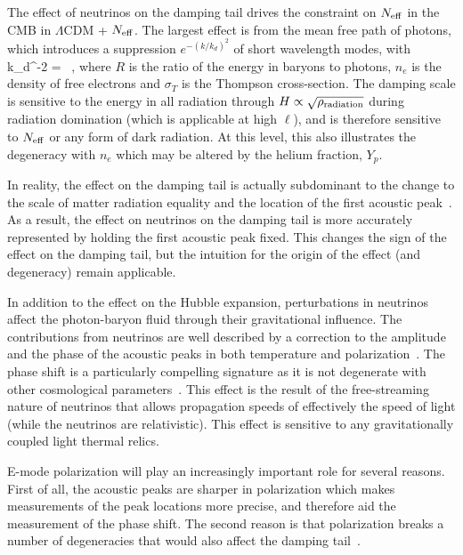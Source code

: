 The effect of neutrinos on the damping tail drives the constraint on $N_{\rm eff}$ in the CMB in $\Lambda$CDM + $N_{\rm eff}$.  The largest effect is from the mean free path of photons, which introduces a suppression $e^{-(k/k_d)^2}$ of short wavelength modes, with~\cite{Zaldarriaga:1995gi}
\beq
k_d^{-2} =\int {}  \ ,
\eeq
where $R$ is the ratio of the energy in baryons to photons, $n_e$ is the density of free electrons and $\sigma_T$ is the Thompson cross-section.  The damping scale is sensitive to the energy in all radiation through $H \propto \sqrt{\rho_{\rm radiation}}$ during radiation domination (which is applicable at high $\ell$), and is therefore sensitive to $N_{\rm eff}$ or any form of dark radiation.  At this level, this also illustrates the degeneracy with $n_e$ which may be altered by the helium fraction, $Y_p$.

In reality, the effect on the damping tail is actually subdominant to the change to the scale of matter radiation equality and the location of the first acoustic peak~\cite{Hou:2011ec}.  As a result, the effect on neutrinos on the damping tail is more accurately represented by holding the first acoustic peak fixed.  This changes the sign of the effect on the damping tail, but the intuition for the origin of the effect (and degeneracy) remain applicable.

In addition to the effect on the Hubble expansion, perturbations in neutrinos affect the photon-baryon fluid through their gravitational influence.  The contributions from neutrinos are well described by a correction to the amplitude and the phase of the acoustic peaks in both temperature and polarization~\cite{Bashinsky:2003tk}.  The phase shift is a particularly compelling signature as it is not degenerate with other cosmological parameters~\cite{Bashinsky:2003tk,Baumann:2015rya}.  This effect is the result of the free-streaming nature of neutrinos that allows propagation speeds of effectively the speed of light (while the neutrinos are relativistic).  This effect is sensitive to any gravitationally coupled light thermal relics.

E-mode polarization will play an increasingly important role for several reasons.  First of all, the acoustic peaks are sharper in polarization which makes measurements of the peak locations more precise, and therefore aid the measurement of the phase shift.  The second reason is that polarization breaks a number of degeneracies that would also affect the damping tail~\cite{Baumann:2015rya}.

